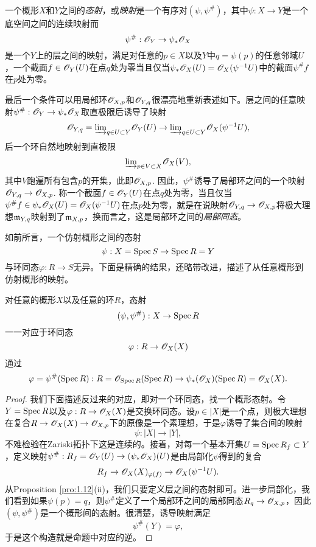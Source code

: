 \begin{defi}
一个概形$X$和$Y$之间的\textit{态射}，或\textit{映射}是一个有序对$(\psi,\psi^\#)$，其中$\psi:X\to Y$是一个底空间之间的连续映射而
\[
	\psi^\#:\mathscr{O}_Y\to \psi_*\mathscr{O}_X
\]
是一个$Y$上的层之间的映射，满足对任意的$p\in X$以及$Y$中$q=\psi(p)$的任意邻域$U$，一个截面$f\in\mathscr{O}_Y(U)$在点$q$处为零当且仅当$\psi_*\mathscr{O}_X(U)=\mathscr{O}_X(\psi^{-1}U)$中的截面$\psi^\# f$在$p$处为零。
\end{defi}

最后一个条件可以用局部环$\mathscr{O}_{X,p}$和$\mathscr{O}_{Y,q}$很漂亮地重新表述如下。层之间的任意映射$\psi^\#:\mathscr{O}_Y\to \psi_* \mathscr{O}_X$取直极限后诱导了映射
\[
	\mathscr{O}_{Y,q}={\varinjlim}_{q\in U\subset Y}\mathscr{O}_Y(U)\to {\varinjlim}_{q\in U\subset Y}\mathscr{O}_X(\psi^{-1}U),
\]
后一个环自然地映射到直极限
\[
	{\varinjlim}_{p\in V\subset X}\mathscr{O}_X(V),
\]
其中$V$跑遍所有包含$p$的开集，此即$\mathscr{O}_{X,p}$. 因此，$\psi^\#$诱导了局部环之间的一个映射$\mathscr{O}_{Y,q}\to \mathscr{O}_{X,p}$. 称一个截面$f\in \mathscr{O}_Y(U)$在点$q$处为零，当且仅当$\psi^\# f\in \psi_*\mathscr{O}_X(U)=\mathscr{O}_X(\psi^{-1}U)$在点$p$处为零，就是在说映射$\mathscr{O}_{Y,q}\to \mathscr{O}_{X,p}$将极大理想$\mathfrak{m}_{Y,q}$映射到了$\mathfrak{m}_{X,p}$，换而言之，这是局部环之间的\textit{局部同态}。

如前所言，一个仿射概形之间的态射
\[
	\psi:X=\operatorname{Spec} S\to\operatorname{Spec} R=Y
\]
与环同态$\varphi:R\to S$无异。下面是精确的结果，还略带改进，描述了从任意概形到仿射概形的映射。

\begin{thm}\label{thm:1.40}
对任意的概形$X$以及任意的环$R$，态射
\[
	(\psi,\psi^\#):X\to \operatorname{Spec} R
\]
一一对应于环同态
\[
	\varphi:R\to \mathscr{O}_X(X)
\]
通过
\[
	\varphi=\psi^\#(\operatorname{Spec} R):R=\mathscr{O}_{\operatorname{Spec} R}(\operatorname{Spec} R)\to \psi_*(\mathscr{O}_X)(\operatorname{Spec} R)=\mathscr{O}_X(X).
\]
\end{thm}

\begin{proof}
我们下面描述反过来的对应，即对一个环同态，找一个概形态射。令$Y=\operatorname{Spec} R$以及$\varphi:R\to \mathscr{O}_X(X)$是交换环同态。设$p\in |X|$是一个点，则极大理想在复合$R\to \mathscr{O}_X(X)\to \mathscr{O}_{X,p}$下的原像是一个素理想，于是$\varphi$诱导了集合间的映射
\[
	\psi:|X|\to |Y|,
\]
不难检验在Zariski拓扑下这是连续的。接着，对每一个基本开集$U=\operatorname{Spec} R_f\subset Y$，定义映射$\psi^\#:R_f=\mathscr{O}_Y(U)\to (\psi_*\mathscr{O}_X)(U)$是由局部化$\psi$得到的复合
\[
	R_f\to \mathscr{O}_X(X)_{\varphi(f)}\to \mathscr{O}_X(\psi^{-1}U).
\]
从Proposition \ref{pro:1.12}(ii)，我们只要定义层之间的态射即可。进一步局部化，我们看到如果$\psi(p)=q$，则$\psi^\#$定义了一个局部环之间的局部同态$R_q\to \mathscr{O}_{X,p}$，因此$(\psi,\psi^\#)$是一个概形间的态射。很清楚，诱导映射满足
\[
	\psi^\#(Y)=\varphi,
\]
于是这个构造就是命题中对应的逆。
\end{proof}

